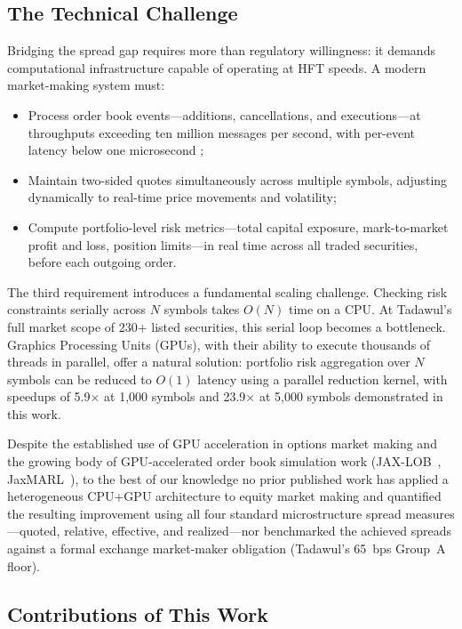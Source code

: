 \documentclass[12pt]{article}
\begin{document}
\subsection{The Technical Challenge}

Bridging the spread gap requires more than regulatory willingness: it demands
computational infrastructure capable of operating at HFT speeds. A modern
market-making system must:
\begin{itemize}
  \item Process order book events---additions, cancellations, and executions---at
        throughputs exceeding ten million messages per second, with per-event
        latency below one microsecond \cite{leber2011};
  \item Maintain two-sided quotes simultaneously across multiple symbols,
        adjusting dynamically to real-time price movements and volatility;
  \item Compute portfolio-level risk metrics---total capital exposure,
        mark-to-market profit and loss, position limits---in real time across
        all traded securities, before each outgoing order.
\end{itemize}

The third requirement introduces a fundamental scaling challenge. Checking risk
constraints serially across $N$ symbols takes $O(N)$ time on a CPU. At
Tadawul's full market scope of 230+ listed securities, this serial loop becomes
a bottleneck. Graphics Processing Units (GPUs), with their ability to execute
thousands of threads in parallel, offer a natural solution: portfolio risk
aggregation over $N$ symbols can be reduced to $O(1)$ latency using a parallel
reduction kernel, with speedups of 5.9$\times$ at 1{,}000 symbols and
23.9$\times$ at 5{,}000 symbols demonstrated in this work.

Despite the established use of GPU acceleration in options market making and
the growing body of GPU-accelerated order book simulation work
(JAX-LOB~\cite{frey2023}, JaxMARL~\cite{lerer2023}), to the best of our
knowledge no prior published work has applied a heterogeneous CPU+GPU
architecture to equity market making and quantified the resulting improvement
using all four standard microstructure spread measures---quoted, relative,
effective, and realized---nor benchmarked the achieved spreads against a formal
exchange market-maker obligation (Tadawul's 65~bps Group~A floor).

\subsection{Contributions of This Work}
\end{document}
